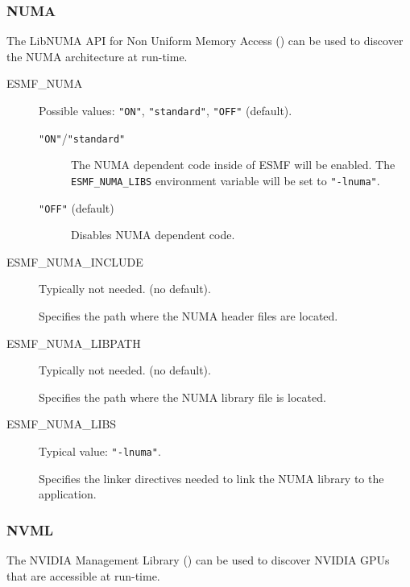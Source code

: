 \subsubsection{NUMA}
\label{sec:NUMA}

The LibNUMA API for Non Uniform Memory Access
()
can be used to discover the NUMA architecture at run-time.

\begin{description}

\item[ESMF\_NUMA] Possible values: {\tt "ON"}, {\tt "standard"}, {\tt "OFF"} (default).

\begin{description}
\item[{\tt "ON"}/{\tt "standard"}] The NUMA dependent code inside of ESMF will
be enabled.
The {\tt ESMF\_NUMA\_LIBS} environment variable will be set to
{\tt "-lnuma"}.

\item[{\tt "OFF"} (default)] Disables NUMA dependent code.
\end{description}

\item[ESMF\_NUMA\_INCLUDE] Typically not needed. (no default).

Specifies the path where the NUMA header files are located.

\item[ESMF\_NUMA\_LIBPATH] Typically not needed. (no default).

Specifies the path where the NUMA library file is located.

\item[ESMF\_NUMA\_LIBS] Typical value: {\tt "-lnuma"}.

Specifies the linker directives needed to link the NUMA library to
the application.

\end{description}

\subsubsection{NVML}
\label{sec:NVML}

The NVIDIA Management Library
()
can be used to discover NVIDIA GPUs that are accessible at run-time.

